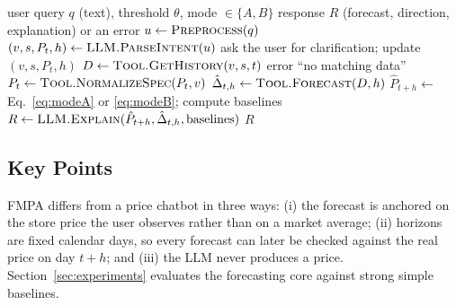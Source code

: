 \begin{algorithm}[t]
\caption{FMPA query handling}
\label{alg:fmpa}
\begin{algorithmic}[1]
\Require user query $q$ (text), threshold $\theta$, mode $\in\{A,B\}$
\Ensure response $R$ (forecast, direction, explanation) or an error
\State $u \gets \Call{Preprocess}{q}$
\State $(v, s, P_t, h) \gets \Call{LLM.ParseIntent}{u}$
  \State ask the user for clarification; update $(v, s, P_t, h)$
\EndWhile
\State $D \gets \Call{Tool.GetHistory}{v, s, t}$ 
  \State \Return error ``no matching data''
\EndIf
\State $P_t \gets \Call{Tool.NormalizeSpec}{P_t, v}$
\State $\hat{\Delta}_{t,h} \gets \Call{Tool.Forecast}{D, h}$ 
\State $\hat{P}_{t+h} \gets$ Eq.~\eqref{eq:modeA} or \eqref{eq:modeB}; compute baselines
\State $R \gets \Call{LLM.Explain}{\hat{P}_{t+h}, \hat{\Delta}_{t,h}, \text{baselines}}$
\State \Return $R$
\end{algorithmic}
\end{algorithm}

\subsection{Key Points}
FMPA differs from a price chatbot in three ways: (i) the forecast is anchored
on the store price the user observes rather than on a market average;
(ii) horizons are fixed calendar days, so every forecast can later be checked
against the real price on day $t+h$; and (iii) the LLM never produces a price.
Section~\ref{sec:experiments} evaluates the forecasting core against strong
simple baselines.
